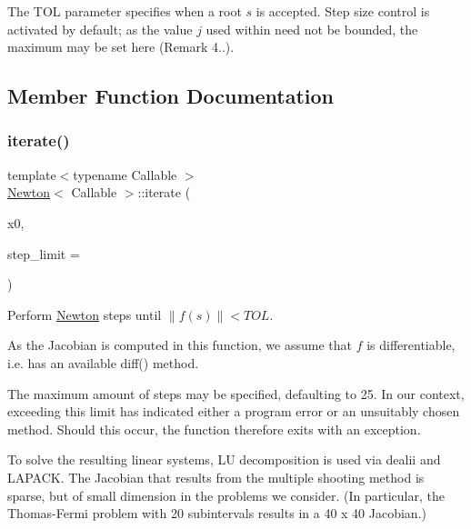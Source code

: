 The T\+OL parameter specifies when a root $s$ is accepted. Step size control is activated by default; as the value $j$ used within need not be bounded, the maximum may be set here (Remark 4..). 

\subsection{Member Function Documentation}
\mbox{\label{classNewton_a39f58ddb9692d7eed4127e2d6f4616f3}} 
\subsubsection{\texorpdfstring{iterate()}{iterate()}}
{\footnotesize\ttfamily template$<$typename Callable $>$ \\
\hyperlink{classNewton}{Newton}$<$ Callable $>$\+::iterate (\begin{DoxyParamCaption}\item[{const Vector\+D2 \&}]{x0,  }\item[{size\+\_\+t}]{step\+\_\+limit = {} }\end{DoxyParamCaption})\hspace{0.3cm}{\ttfamily [inline]}}



Perform \hyperlink{classNewton}{Newton} steps until $\|f(s)\| < TOL$. 

As the Jacobian is computed in this function, we assume that $f$ is differentiable, i.\+e. has an available {\ttfamily diff()} method.

The maximum amount of steps may be specified, defaulting to 25. In our context, exceeding this limit has indicated either a program error or an unsuitably chosen method. Should this occur, the function therefore exits with an exception.

To solve the resulting linear systems, LU decomposition is used via dealii and L\+A\+P\+A\+CK. The Jacobian that results from the multiple shooting method is sparse, but of small dimension in the problems we consider. (In particular, the Thomas-\/\+Fermi problem with 20 subintervals results in a 40 x 40 Jacobian.) \mbox{\label{classNewton_a8040c553c7cb3adf19eba02a5afabdb0}} 
